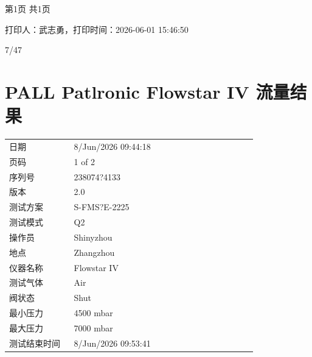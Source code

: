\documentclass[UTF8,10pt,a4paper,fontset=fandol]{ctexart}
\newcommand{\fieldvalue}[1]{#1}
\newcommand{\handwritten}[1]{#1}
\begin{document}
\noindent 第1页 共1页

\medskip

\noindent 打印人：武志勇，打印时间：2026-06-01 15:46:50

\noindent
\fieldvalue{\handwritten{7/47}}

\newpage

\section*{PALL Patlronic Flowstar IV 流量结果}

\begin{tabular}{@{}p{0.24\linewidth}p{0.68\linewidth}@{}}
日期 &
\fieldvalue{8/Jun/2026 09:44:18}
\\
页码 &
\fieldvalue{1 of 2}
\\
序列号 &
\fieldvalue{238074?4133}
\\
版本 &
\fieldvalue{2.0}
\\
测试方案 &
\fieldvalue{S-FMS?E-2225}
\\
测试模式 &
\fieldvalue{Q2}
\\
操作员 &
\fieldvalue{Shinyzhou}
\\
地点 &
\fieldvalue{Zhangzhou}
\\
仪器名称 &
\fieldvalue{Flowstar IV}
\\
测试气体 &
\fieldvalue{Air}
\\
阀状态 &
\fieldvalue{Shut}
\\
最小压力 &
\fieldvalue{4500 mbar}
\\
最大压力 &
\fieldvalue{7000 mbar}
\\
测试结束时间 &
\fieldvalue{8/Jun/2026 09:53:41}
\end{tabular}
\end{document}
